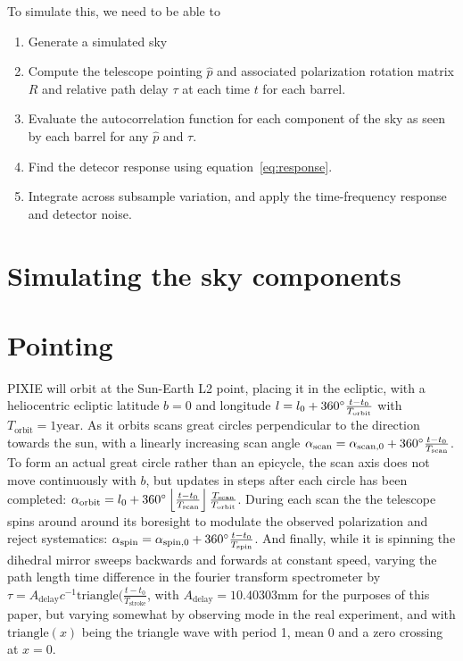 \documentclass{article}
\begin{document}
To simulate this, we need to be able to
\begin{enumerate}
	\item Generate a simulated sky
	\item Compute the telescope pointing $\hat p$ and associated polarization rotation
	matrix $R$ and relative path delay $\tau$ at each time $t$ for each barrel.
	\item Evaluate the autocorrelation function for each component of the sky as
	seen by each barrel for any $\hat p$ and $\tau$.
	\item Find the detecor response using equation~\ref{eq:response}.
	\item Integrate across subsample variation, and apply the time-frequency
	response and detector noise.
\end{enumerate}

\section{Simulating the sky components}

\section{Pointing}
PIXIE will orbit at the Sun-Earth L2 point, placing it in the ecliptic, with
a heliocentric ecliptic latitude $b=0$ and longitude $l=l_0 +
360\degree\frac{t-t_0}{T_\textrm{orbit}}$ with $T_\textrm{orbit} = 1\textrm{year}$.
As it orbits scans great circles
perpendicular to the direction towards the sun, with a linearly increasing scan angle
$\alpha_\textrm{scan} = \alpha_{\textrm{scan},0} + 360\degree \frac{t-t_0}{T_\textrm{scan}}$.
To form an actual great circle rather than an epicycle, the scan axis does not
move continuously with $b$, but updates in steps after each circle has been completed:
$\alpha_\textrm{orbit} = l_0 + 360\degree\left\lfloor\frac{t-t_0}{T_\textrm{scan}}\right\rfloor\frac{T_\textrm{scan}}{T_\textrm{orbit}}$.
During each scan the the telescope spins around around its boresight to modulate
the observed polarization and reject systematics: $\alpha_\textrm{spin} =
\alpha_{\textrm{spin},0} + 360\degree\frac{t-t_0}{T_\textrm{spin}}$. And finally,
while it is spinning the dihedral mirror sweeps backwards and forwards at constant
speed, varying the path length time difference in the fourier transform spectrometer
by $\tau = A_\textrm{delay}c^{-1} \textrm{triangle}\Big(\frac{t-t_0}{T_\textrm{stroke}}$,
with $A_\textrm{delay} = 10.40303 \textrm{mm}$ for the purposes of this paper, but
varying somewhat by observing mode in the real experiment, and with
$\textrm{triangle}(x)$ being the triangle wave with period 1, mean 0 and a zero
crossing at $x=0$.
\end{document}

